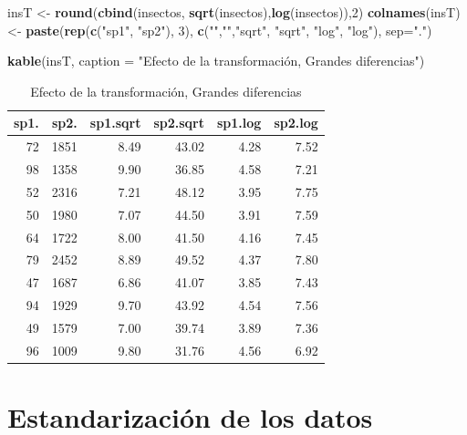 \documentclass[]{book}
\newenvironment{Shaded}{\begin{snugshade}}{\end{snugshade}}
\newcommand{\KeywordTok}[1]{\textcolor[rgb]{0.13,0.29,0.53}{\textbf{{#1}}}}
\newcommand{\DataTypeTok}[1]{\textcolor[rgb]{0.13,0.29,0.53}{{#1}}}
\newcommand{\DecValTok}[1]{\textcolor[rgb]{0.00,0.00,0.81}{{#1}}}
\newcommand{\StringTok}[1]{\textcolor[rgb]{0.31,0.60,0.02}{{#1}}}
\newcommand{\NormalTok}[1]{{#1}}
\begin{document}
\begin{Shaded}
\begin{Highlighting}[]
\NormalTok{insT <-}\StringTok{ }\KeywordTok{round}\NormalTok{(}\KeywordTok{cbind}\NormalTok{(insectos, }\KeywordTok{sqrt}\NormalTok{(insectos),}\KeywordTok{log}\NormalTok{(insectos)),}\DecValTok{2}\NormalTok{) }
\KeywordTok{colnames}\NormalTok{(insT) <-}\StringTok{ }\KeywordTok{paste}\NormalTok{(}\KeywordTok{rep}\NormalTok{(}\KeywordTok{c}\NormalTok{(}\StringTok{"sp1"}\NormalTok{, }\StringTok{"sp2"}\NormalTok{), }\DecValTok{3}\NormalTok{), }\KeywordTok{c}\NormalTok{(}\StringTok{""}\NormalTok{,}\StringTok{""}\NormalTok{,}\StringTok{"sqrt"}\NormalTok{, }\StringTok{"sqrt"}\NormalTok{, }\StringTok{"log"}\NormalTok{, }\StringTok{"log"}\NormalTok{), }\DataTypeTok{sep=}\StringTok{"."}\NormalTok{)}

\KeywordTok{kable}\NormalTok{(insT, }\DataTypeTok{caption =} \StringTok{"Efecto de la transformación, Grandes diferencias"}\NormalTok{)}
\end{Highlighting}
\end{Shaded}

\begin{table}

\caption{\label{tab:unnamed-chunk-16}Efecto de la transformación, Grandes diferencias}
\centering
\begin{tabular}[t]{r|r|r|r|r|r}
\hline
sp1. & sp2. & sp1.sqrt & sp2.sqrt & sp1.log & sp2.log\\
\hline
72 & 1851 & 8.49 & 43.02 & 4.28 & 7.52\\
\hline
98 & 1358 & 9.90 & 36.85 & 4.58 & 7.21\\
\hline
52 & 2316 & 7.21 & 48.12 & 3.95 & 7.75\\
\hline
50 & 1980 & 7.07 & 44.50 & 3.91 & 7.59\\
\hline
64 & 1722 & 8.00 & 41.50 & 4.16 & 7.45\\
\hline
79 & 2452 & 8.89 & 49.52 & 4.37 & 7.80\\
\hline
47 & 1687 & 6.86 & 41.07 & 3.85 & 7.43\\
\hline
94 & 1929 & 9.70 & 43.92 & 4.54 & 7.56\\
\hline
49 & 1579 & 7.00 & 39.74 & 3.89 & 7.36\\
\hline
96 & 1009 & 9.80 & 31.76 & 4.56 & 6.92\\
\hline
\end{tabular}
\end{table}

\section{Estandarización de los
datos}\label{estandarizacion-de-los-datos}
\end{document}
